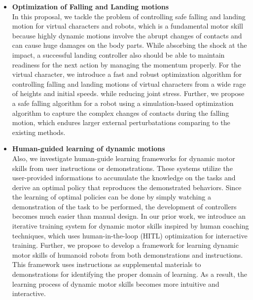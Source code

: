 \begin{itemize}
\item 
  \textbf{Optimization of Falling and Landing motions}
  \\
  In this proposal, we tackle the problem of controlling safe falling 
  and landing motion for virtual characters and robots, which is a fundamental
  motor skill because highly dynamic motions involve the abrupt changes
  of contacts and can cause huge damages on the body parts.
  While absorbing the shock at the impact, a successful landing controller 
  also should be able to maintain readiness for the next action by managing
  the momentum properly.
  For the virtual character, we introduce a fast and robust optimization 
  algorithm for controlling falling and landing motions of virtual
  characters from a wide rage of heights and initial speeds.
  while reducing joint stress.
  Further, we propose a safe falling algorithm for a robot using
  a simulation-based optimization algorithm to capture the complex
  changes of contacts during the falling motion, which endures larger 
  external perturbatations comparing to the existing methods.
\item 
  \textbf{Human-guided learning of dynamic motions}
  \\
  Also, we investigate human-guide learning frameworks for dynamic
  motor skills from user instructions or demonstrations.
  These systems utilize the user-provided informations to
  accumulate the knowledge on the tasks and derive
  an optimal policy that reproduces the demonstrated behaviors.
  Since the learning of optimal policies can be done by simply
  watching a demonstration of the task to be performed,
  the development of controllers becomes much easier 
  than manual design.
  In our prior work, we introduce an iterative training system for dynamic
  motor skills inspired by human coaching techniques, which uses 
  human-in-the-loop (HITL) optimization for interactive training.  
  Further, we propose to develop a framework for learning 
  dynamic motor skills of humanoid robots
  from both demonstrations and instructions.
  This framework uses instructions as supplemental
  materials to demonstrations for identifying the proper domain
  of learning.
  As a result, the learning process of dynamic motor skills 
  becomes more intuitive and interactive.

\end{itemize}

